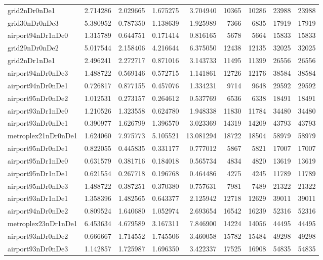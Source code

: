 \begin{longtable}{|l|r|r|r|r|r|r|r|r|}
grid2nDr0nDe1 & 2.714286 & 2.029665 & 1.675275 & 3.704940 & 10365 & 10286 & 23988 & 23988 \\
grid30nDr0nDe3 & 5.380952 & 0.787350 & 1.138639 & 1.925989 & 7366 & 6835 & 17919 & 17919 \\
airport94nDr1nDe0 & 1.315789 & 0.644751 & 0.171414 & 0.816165 & 5678 & 5664 & 15833 & 15833 \\
grid29nDr0nDe2 & 5.017544 & 2.158406 & 4.216644 & 6.375050 & 12438 & 12135 & 32025 & 32025 \\
grid2nDr1nDe1 & 2.496241 & 2.272717 & 0.871016 & 3.143733 & 11495 & 11399 & 26556 & 26556 \\
airport94nDr0nDe3 & 1.488722 & 0.569146 & 0.572715 & 1.141861 & 12726 & 12176 & 38584 & 38584 \\
airport94nDr0nDe1 & 0.726817 & 0.877155 & 0.457076 & 1.334231 & 9714 & 9648 & 29592 & 29592 \\
airport95nDr0nDe2 & 1.012531 & 0.273157 & 0.264612 & 0.537769 & 6536 & 6338 & 18491 & 18491 \\
airport93nDr1nDe0 & 1.210526 & 1.323558 & 0.624780 & 1.948338 & 11830 & 11784 & 34480 & 34480 \\
airport93nDr0nDe1 & 0.390977 & 1.626799 & 1.396570 & 3.023369 & 14319 & 14209 & 43793 & 43793 \\
metroplex21nDr0nDe1 & 1.624060 & 7.975773 & 5.105521 & 13.081294 & 18722 & 18504 & 58979 & 58979 \\
airport95nDr0nDe1 & 0.822055 & 0.445835 & 0.331177 & 0.777012 & 5867 & 5821 & 17007 & 17007 \\
airport95nDr1nDe0 & 0.631579 & 0.381716 & 0.184018 & 0.565734 & 4834 & 4820 & 13619 & 13619 \\
airport95nDr1nDe1 & 0.621554 & 0.267718 & 0.196768 & 0.464486 & 4275 & 4245 & 11789 & 11789 \\
airport95nDr0nDe3 & 1.488722 & 0.387251 & 0.370380 & 0.757631 & 7981 & 7489 & 21322 & 21322 \\
airport93nDr1nDe1 & 1.358396 & 1.482565 & 0.643377 & 2.125942 & 12718 & 12629 & 39011 & 39011 \\
airport94nDr0nDe2 & 0.809524 & 1.640680 & 1.052974 & 2.693654 & 16542 & 16239 & 52316 & 52316 \\
metroplex23nDr1nDe1 & 6.453634 & 4.679589 & 3.167311 & 7.846900 & 14224 & 14056 & 44495 & 44495 \\
airport93nDr0nDe2 & 0.666667 & 1.714552 & 1.745506 & 3.460058 & 15782 & 15484 & 49298 & 49298 \\
airport93nDr0nDe3 & 1.142857 & 1.725987 & 1.696350 & 3.422337 & 17525 & 16908 & 54835 & 54835 \\

\end{longtable}
